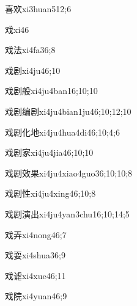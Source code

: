 \begin{verbete}{喜欢}{xi3huan5}{12;6}
\end{verbete}
\begin{verbete}{戏}{xi4}{6}
\end{verbete}
\begin{verbete}{戏法}{xi4fa3}{6;8}
\end{verbete}
\begin{verbete}{戏剧}{xi4ju4}{6;10}
\end{verbete}
\begin{verbete}{戏剧般}{xi4ju4ban1}{6;10;10}
\end{verbete}
\begin{verbete}{戏剧编剧}{xi4ju4bian1ju4}{6;10;12;10}
\end{verbete}
\begin{verbete}{戏剧化地}{xi4ju4hua4di4}{6;10;4;6}
\end{verbete}
\begin{verbete}{戏剧家}{xi4ju4jia4}{6;10;10}
\end{verbete}
\begin{verbete}{戏剧效果}{xi4ju4xiao4guo3}{6;10;10;8}
\end{verbete}
\begin{verbete}{戏剧性}{xi4ju4xing4}{6;10;8}
\end{verbete}
\begin{verbete}{戏剧演出}{xi4ju4yan3chu1}{6;10;14;5}
\end{verbete}
\begin{verbete}{戏弄}{xi4nong4}{6;7}
\end{verbete}
\begin{verbete}{戏耍}{xi4shua3}{6;9}
\end{verbete}
\begin{verbete}{戏谑}{xi4xue4}{6;11}
\end{verbete}
\begin{verbete}{戏院}{xi4yuan4}{6;9}
\end{verbete}
